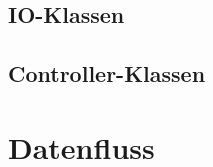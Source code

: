\subsection{IO-Klassen}

\clearpage
\subsection{Controller-Klassen}

\section{Datenfluss}
\cleardoublepage